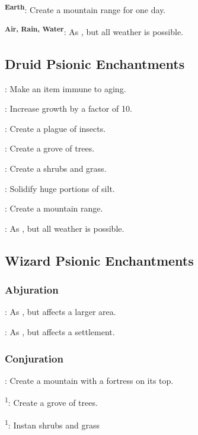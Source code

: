 \textsuperscript{\bfseries Earth}: Create a mountain range for one day.

\textsuperscript{\bfseries Air, Rain, Water}: As , but all weather is possible.



\subsection{Druid Psionic Enchantments}
: Make an item immune to aging.

: Increase growth by a factor of 10.

: Create a plague of insects.

: Create a grove of trees.

: Create a shrubs and grass.

: Solidify huge portions of silt.

: Create a mountain range.

: As , but all weather is possible.



\subsection{Wizard Psionic Enchantments}
\subsubsection{Abjuration}
: As , but affects a larger area.

: As , but affects a settlement. %


\subsubsection{Conjuration}
: Create a mountain with a fortress on its top.

\textsuperscript{1}: Create a grove of trees.

\textsuperscript{1}: Instan shrubs and grass

